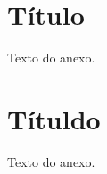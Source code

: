 \documentclass[
    12pt,               %
    openright,          %
    oneside,            %
    a4paper,            %
    english,            %
    french,             %
    spanish,            %
    brazil              %
    ]{abntex2}
\begin{document}

\begin{anexosenv}

\partanexos

\chapter{Título}

Texto do anexo.

\chapter{Títuldo}

Texto do anexo.

\end{anexosenv}

\printindex
\end{document}
